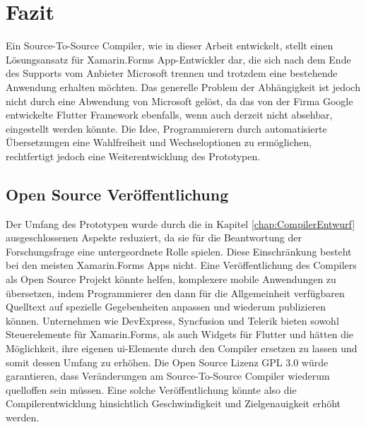 \chapter{Fazit}
\label{chap:FazitAusblick}
Ein Source-To-Source Compiler,  wie in dieser Arbeit entwickelt, stellt einen Lösungsansatz für Xamarin.Forms App-Entwickler dar,  die sich nach dem Ende des Supports vom Anbieter Microsoft trennen und trotzdem eine bestehende Anwendung erhalten möchten.  Das generelle Problem der Abhängigkeit ist jedoch nicht durch eine Abwendung von Microsoft gelöst, da das von der Firma Google entwickelte Flutter Framework ebenfalls, wenn auch derzeit nicht absehbar,  eingestellt werden könnte.  Die Idee,  Programmierern durch automatisierte Übersetzungen eine Wahlfreiheit und Wechseloptionen zu ermöglichen, rechtfertigt jedoch eine Weiterentwicklung des Prototypen.

\section{Open Source Veröffentlichung}

Der Umfang des Prototypen wurde durch die in Kapitel \ref{chap:CompilerEntwurf} ausgeschlossenen Aspekte reduziert,  da sie für die Beantwortung der Forschungsfrage eine untergeordnete Rolle spielen.  Diese Einschränkung besteht bei den meisten Xamarin.Forms Apps nicht.  
Eine Veröffentlichung des Compilers als Open Source Projekt könnte helfen,  komplexere mobile Anwendungen zu übersetzen,  indem Programmierer den dann für die Allgemeinheit verfügbaren Quelltext auf spezielle Gegebenheiten anpassen und wiederum publizieren können.  Unternehmen wie DevExpress,  Syncfusion und Telerik bieten sowohl Steuerelemente für 
Xamarin.Forms,  als auch Widgets für Flutter und hätten die Möglichkeit,  ihre eigenen \ac{ui}-Elemente 
durch den Compiler ersetzen zu lassen und somit dessen Umfang zu erhöhen.  Die Open Source Lizenz GPL 3.0 würde garantieren,  dass Veränderungen am Source-To-Source Compiler wiederum quelloffen sein müssen.  Eine solche Veröffentlichung könnte also die Compilerentwicklung hinsichtlich Geschwindigkeit und Zielgenauigkeit erhöht werden.

